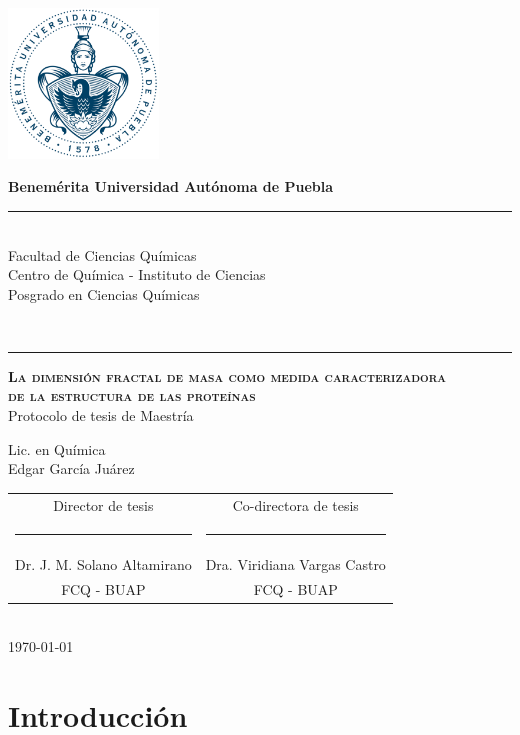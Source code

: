 \documentclass[11pt]{article}
\newcommand\vtab[1][0.5cm]{\vspace*{#1}}
\begin{document}
\pagestyle{empty} 
\phantom{a}
\vspace{-1.4cm}
\begin{center}
\includegraphics[width=4cm]{buap.pdf}

\Large{\textbf{Benem\'{e}rita Universidad Aut\'{o}noma de Puebla}\\
\rule{150mm}{0.1mm}\\
Facultad de Ciencias Qu\'{i}micas\\
Centro de Qu\'{i}mica - Instituto de Ciencias\\
Posgrado en Ciencias Qu\'{i}micas}\\
\rule{150mm}{0.1mm}

\vtab[.1cm]
{\scshape\large \textbf{La dimensi\'{o}n fractal de masa como medida caracterizadora\\de la estructura de las prote\'{i}nas}}\\
\vtab[.1cm]
\Large{Protocolo de tesis de Maestr\'{i}a}\\
\vtab[0.2cm]

Lic. en Qu\'{i}mica \\
Edgar Garc\'{i}a Ju\'{a}rez \\
\vtab[0.5cm]
\begin{tabular}{cc}
\vtab[10mm]
Director de tesis & Co-directora de tesis \\
\rule{50mm}{0.1mm} & \rule{50mm}{0.1mm} \\
Dr. J. M. Solano Altamirano & Dra. Viridiana Vargas Castro \\ 
FCQ - BUAP & FCQ - BUAP \\ 
\end{tabular} 
\vtab[1cm] \\
{\today}
\end{center}

\clearpage

\section{Introducci\'{o}n}
\end{document}
